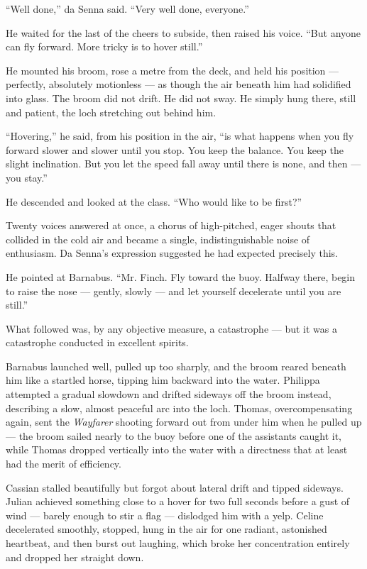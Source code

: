 \enquote{Well done,} da Senna said. \enquote{Very well done, everyone.}
 
He waited for the last of the cheers to subside, then raised his voice. \enquote{But anyone can fly forward. More tricky is to hover still.}
 
He mounted his broom, rose a metre from the deck, and held his position --- perfectly, absolutely motionless --- as though the air beneath him had solidified into glass. The broom did not drift. He did not sway. He simply hung there, still and patient, the loch stretching out behind him.
 
\enquote{Hovering,} he said, from his position in the air, \enquote{is what happens when you fly forward slower and slower until you stop. You keep the balance. You keep the slight inclination. But you let the speed fall away until there is none, and then --- you stay.}
 
He descended and looked at the class. \enquote{Who would like to be first?}
 
Twenty voices answered at once, a chorus of high-pitched, eager shouts that collided in the cold air and became a single, indistinguishable noise of enthusiasm. Da Senna's expression suggested he had expected precisely this.
 
He pointed at Barnabus. \enquote{Mr. Finch. Fly toward the buoy. Halfway there, begin to raise the nose --- gently, slowly --- and let yourself decelerate until you are still.}
 
What followed was, by any objective measure, a catastrophe --- but it was a catastrophe conducted in excellent spirits.
 
Barnabus launched well, pulled up too sharply, and the broom reared beneath him like a startled horse, tipping him backward into the water. Philippa attempted a gradual slowdown and drifted sideways off the broom instead, describing a slow, almost peaceful arc into the loch. Thomas, overcompensating again, sent the \textit{Wayfarer} shooting forward out from under him when he pulled up --- the broom sailed nearly to the buoy before one of the assistants caught it, while Thomas dropped vertically into the water with a directness that at least had the merit of efficiency.
 
Cassian stalled beautifully but forgot about lateral drift and tipped sideways. Julian achieved something close to a hover for two full seconds before a gust of wind --- barely enough to stir a flag --- dislodged him with a yelp. Celine decelerated smoothly, stopped, hung in the air for one radiant, astonished heartbeat, and then burst out laughing, which broke her concentration entirely and dropped her straight down.
 
